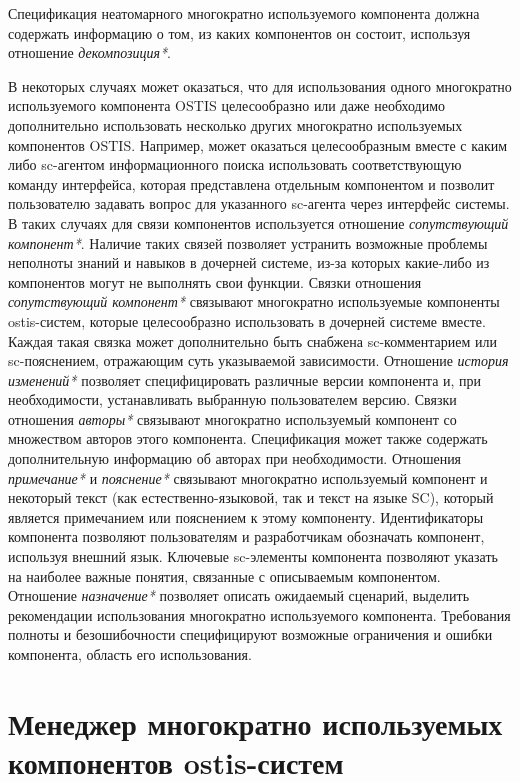Спецификация неатомарного многократно используемого компонента должна содержать информацию о том, из каких компонентов он состоит, используя отношение \textit{декомпозиция*}. 

В некоторых случаях может оказаться, что для использования одного многократно используемого компонента OSTIS целесообразно или даже необходимо дополнительно использовать несколько других многократно используемых компонентов OSTIS. Например, может оказаться целесообразным вместе с каким либо sc-агентом информационного поиска использовать соответствующую команду интерфейса, которая представлена отдельным компонентом и позволит пользователю задавать вопрос для указанного sc-агента через интерфейс системы. В таких случаях для связи компонентов используется отношение \textit{сопутствующий компонент*}. Наличие таких связей позволяет устранить возможные проблемы неполноты знаний и навыков в дочерней системе, из-за которых какие-либо из компонентов могут не выполнять свои функции. Связки отношения \textit{сопутствующий компонент*} связывают многократно используемые компоненты ostis-систем, которые целесообразно использовать в дочерней системе вместе. Каждая такая связка может дополнительно быть снабжена sc-комментарием или sc-пояснением, отражающим суть указываемой зависимости. Отношение \textit{история изменений*} позволяет специфицировать различные версии компонента и, при необходимости, устанавливать выбранную пользователем версию. Связки отношения \textit{авторы*} связывают многократно используемый компонент со множеством авторов этого компонента. Спецификация может также содержать дополнительную информацию об авторах при необходимости. Отношения \textit{примечание*} и \textit{пояснение*} связывают многократно используемый компонент и некоторый текст (как естественно-языковой, так и текст на языке SC), который является примечанием или пояснением к этому компоненту. Идентификаторы компонента позволяют пользователям и разработчикам обозначать компонент, используя внешний язык. Ключевые sc-элементы компонента позволяют указать на наиболее важные понятия, связанные с описываемым компонентом. Отношение \textit{назначение*} позволяет описать ожидаемый сценарий, выделить рекомендации использования многократно используемого компонента. Требования полноты и безошибочности специфицируют возможные ограничения и ошибки компонента, область его использования.

\section{Менеджер многократно используемых компонентов ostis-систем}
\label{ostis_library_component_manager}

